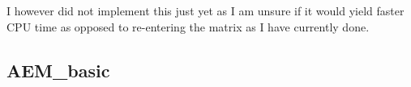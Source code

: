 I however did not implement this just yet as I am unsure if it would yield faster CPU time as opposed to re-entering the matrix as I have currently done.

\newpage
\subsection{AEM\_basic}






